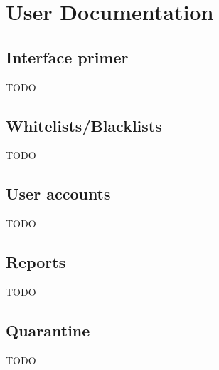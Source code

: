 \documentclass[a4paper,10pt,english]{manual}
\begin{document}
\chapter{User Documentation}


\section{Interface primer}

TODO


\section{Whitelists/Blacklists}

TODO


\section{User accounts}

TODO


\section{Reports}

TODO


\section{Quarantine}

TODO


\renewcommand{\indexname}{Module Index}
\printmodindex
\renewcommand{\indexname}{Index}
\printindex
\end{document}

